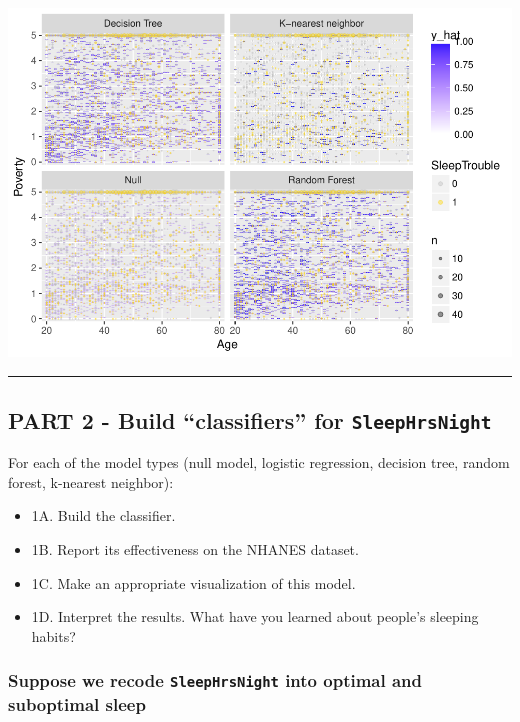\documentclass[]{article}
\providecommand{\tightlist}{%
  \setlength{\itemsep}{0pt}\setlength{\parskip}{0pt}}
\begin{document}
\includegraphics{Hmwk7AnswerKey_files/figure-latex/unnamed-chunk-15-1.pdf}

\begin{center}\rule{0.5\linewidth}{\linethickness}\end{center}

\subsection{\texorpdfstring{PART 2 - Build ``classifiers'' for
\texttt{SleepHrsNight}}{PART 2 - Build classifiers for SleepHrsNight}}\label{part-2---build-classifiers-for-sleephrsnight}

For each of the model types (null model, logistic regression, decision
tree, random forest, k-nearest neighbor):

\begin{itemize}
\tightlist
\item
  1A. Build the classifier.
\item
  1B. Report its effectiveness on the NHANES dataset.
\item
  1C. Make an appropriate visualization of this model.
\item
  1D. Interpret the results. What have you learned about people's
  sleeping habits?
\end{itemize}

\subsubsection{\texorpdfstring{Suppose we recode \texttt{SleepHrsNight}
into optimal and suboptimal
sleep}{Suppose we recode SleepHrsNight into optimal and suboptimal sleep}}\label{suppose-we-recode-sleephrsnight-into-optimal-and-suboptimal-sleep}
\end{document}
